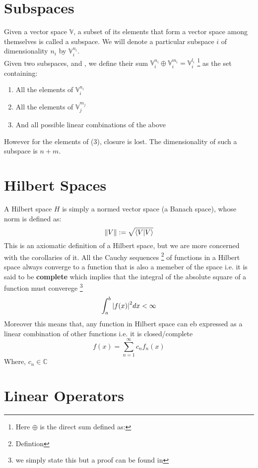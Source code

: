 \section{Subspaces}
Given a vector space $\mathbb{V}$, a subset of its elements that form a vector space among themselves is called a subspace. We will denote a particular subspace $i$ of dimensionality $n_{i}$ by $\mathbb{V}^{n_{i}}_{i}$.\\
   Given two subspaces, and , we define their sum $\mathbb{V}^{n_{i}}_{i} \oplus \mathbb{V}^{m_{i}}_{i} = \mathbb{V}^{l_{i}}_{i}$ \footnote{Here $\oplus$ is the direct sum defined as: } as the set containing:
\begin{enumerate}
\item All the elements of $\mathbb{V}^{n_{i}}_{i}$
\item All the elements of $\mathbb{V}^{m_{j}}_{j}$
\item And all possible linear combinations of the above
\end{enumerate} 
However for the elements of (3), closure is lost. The dimensionality of such a subspace is $n + m$.
\section{Hilbert Spaces}
A Hilbert space $H$ is simply a normed vector space (a Banach space), whose norm is defined as:
\begin{equation} \label{norm}
\norm{V} := \sqrt{\braket{V}{V}}
\end{equation}
This is an axiomatic definition of a Hilbert space, but we are more concerned with the corollaries of it. All the Cauchy sequences \footnote{Defintion} of functions in a Hilbert space always converge to a function that is also a memeber of the space i.e. it is said to be \textbf{complete} which implies that the integral of the absolute square of a function must converege \footnote{we simply state this but a proof can be found in}
\begin{equation}
\int_{a}^{b} \abs{f(x)}^{2} dx < \infty
\end{equation}
Moreover this means that, any function in Hilbert space can eb expressed as a linear combination of other functions i.e. it is closed/complete
\begin{equation}
f(x) = \sum_{n = 1}^{\infty} c_{n} f_{n}(x)
\end{equation}
Where, $c_{n} \in \mathbb{C}$
\section{Linear Operators}
